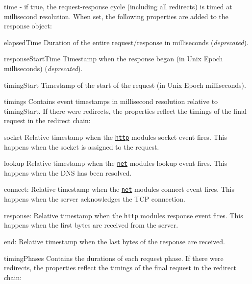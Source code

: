 \begin{DoxyItemize}
\item {\ttfamily time} -\/ if {\ttfamily true}, the request-\/response cycle (including all redirects) is timed at millisecond resolution. When set, the following properties are added to the response object\+:
\begin{DoxyItemize}
\item {\ttfamily elapsed\+Time} Duration of the entire request/response in milliseconds ({\itshape deprecated}).
\item {\ttfamily response\+Start\+Time} Timestamp when the response began (in Unix Epoch milliseconds) ({\itshape deprecated}).
\item {\ttfamily timing\+Start} Timestamp of the start of the request (in Unix Epoch milliseconds).
\item {\ttfamily timings} Contains event timestamps in millisecond resolution relative to {\ttfamily timing\+Start}. If there were redirects, the properties reflect the timings of the final request in the redirect chain\+:
\begin{DoxyItemize}
\item {\ttfamily socket} Relative timestamp when the \href{https://nodejs.org/api/http.html#http_event_socket}{\tt {\ttfamily http}} module\textquotesingle{}s {\ttfamily socket} event fires. This happens when the socket is assigned to the request.
\item {\ttfamily lookup} Relative timestamp when the \href{https://nodejs.org/api/net.html#net_event_lookup}{\tt {\ttfamily net}} module\textquotesingle{}s {\ttfamily lookup} event fires. This happens when the D\+NS has been resolved.
\item {\ttfamily connect}\+: Relative timestamp when the \href{https://nodejs.org/api/net.html#net_event_connect}{\tt {\ttfamily net}} module\textquotesingle{}s {\ttfamily connect} event fires. This happens when the server acknowledges the T\+CP connection.
\item {\ttfamily response}\+: Relative timestamp when the \href{https://nodejs.org/api/http.html#http_event_response}{\tt {\ttfamily http}} module\textquotesingle{}s {\ttfamily response} event fires. This happens when the first bytes are received from the server.
\item {\ttfamily end}\+: Relative timestamp when the last bytes of the response are received.
\end{DoxyItemize}
\item {\ttfamily timing\+Phases} Contains the durations of each request phase. If there were redirects, the properties reflect the timings of the final request in the redirect chain\+:

\end{DoxyItemize}
\end{DoxyItemize}
